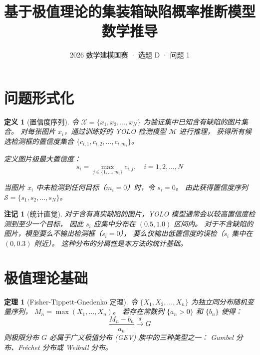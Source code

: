 \documentclass[12pt, a4paper]{ctexart}
\title{\textbf{基于极值理论的集装箱缺陷概率推断模型 \\ 数学推导}}
\author{2026 数学建模国赛 · 选题 D · 问题 1}
\date{}
\newtheorem{definition}{定义}[section]
\newtheorem{theorem}{定理}[section]
\newtheorem{remark}{注记}[section]
\begin{document}
\maketitle

\section{问题形式化}

\begin{definition}[置信度序列]
令 $\mathcal{X} = \{x_1, x_2, \ldots, x_N\}$ 为验证集中已知含有缺陷的图片集合。
对每张图片 $x_i$，通过训练好的 YOLO 检测模型 $\mathcal{M}$ 进行推理，
获得所有候选检测框的置信度集合 $\{c_{i,1}, c_{i,2}, \ldots, c_{i,m_i}\}$。

定义图片级最大置信度：
\begin{equation}
    s_i = \max_{j \in \{1, \ldots, m_i\}} c_{i,j}, \quad i = 1, 2, \ldots, N
    \label{eq:max_conf}
\end{equation}

当图片 $x_i$ 中未检测到任何目标（$m_i = 0$）时，令 $s_i = 0$。
由此获得置信度序列 $\mathcal{S} = \{s_1, s_2, \ldots, s_N\}$。
\end{definition}

\begin{remark}[统计直觉]
对于含有真实缺陷的图片，YOLO 模型通常会以较高置信度检测到至少一个目标，
因此 $s_i$ 应集中分布在 $(0.5, 1.0)$ 区间内。
对于不含缺陷的图片，模型要么不输出检测框（$s_i = 0$），
要么仅输出低置信度的误检（$s_i$ 集中在 $(0, 0.3)$ 附近）。
这种分布的分离性是本方法的统计基础。
\end{remark}

\section{极值理论基础}

\begin{theorem}[Fisher-Tippett-Gnedenko 定理]
令 $\{X_1, X_2, \ldots, X_n\}$ 为独立同分布随机变量序列，
$M_n = \max(X_1, \ldots, X_n)$。
若存在常数列 $\{a_n > 0\}$ 和 $\{b_n\}$ 使得：
\begin{equation}
    \frac{M_n - b_n}{a_n} \xrightarrow{d} G
\end{equation}
则极限分布 $G$ 必属于广义极值分布 (GEV) 族中的三种类型之一：
Gumbel 分布、Fr\'{e}chet 分布或 Weibull 分布。
\end{theorem}
\end{document}
